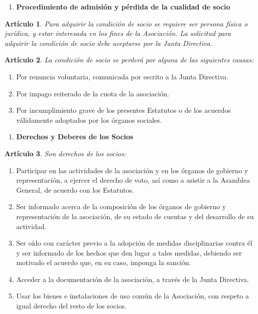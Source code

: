 \documentclass[a4paper,12pt]{article}
\theoremstyle{mystyle}		%
\newtheorem{art}{Artículo}	%
\begin{document}
\begin{onehalfspace}
\bigskip

\begin{enumerate}[resume*=capitulo]\centering
 \item \textbf{Procedimiento de admisión y pérdida de la cualidad de socio}
\end{enumerate}

\begin{art}
Para adquirir la condición de socio se requiere ser persona física o jurídica, y estar interesada en los fines de la Asociación. La solicitud para adquirir la condición de socio debe aceptarse por la Junta Directiva.
\end{art}

\begin{art}
La condición de socio se perderá por alguna de las siguientes causas:
\end{art}
\begin{enumerate}[label={\alph*)}]
 \item Por renuncia voluntaria, comunicada por escrito a la Junta Directiva.
 \item Por impago reiterado de la cuota de la asociación.
 \item Por incumplimiento grave de los presentes Estatutos o de los acuerdos válidamente adoptados por los órganos sociales.
\end{enumerate}

\bigskip

\begin{enumerate}[resume*=capitulo]\centering
 \item \textbf{Derechos y Deberes de los Socios}
\end{enumerate}

\begin{art}
Son derechos de los socios:
\end{art}
\begin{enumerate}[label={\alph*)}]
 \item Participar en las actividades de la asociación y en los órganos de gobierno y representación, a ejercer el derecho de voto, así como a asistir a la Asamblea General, de acuerdo con los Estatutos.
 \item Ser informado acerca de la composición de los órganos de gobierno y representación de la asociación, de su estado de cuentas y del desarrollo de su actividad.
 \item Ser oído con carácter previo a la adopción de medidas disciplinarias contra él y ser informado de los hechos que den lugar a tales medidas, debiendo ser motivado el acuerdo que, en su caso, imponga la sanción.
 \item Acceder a la documentación de la asociación, a través de la Junta Directiva.
 \item Usar los bienes e instalaciones de uso común de la Asociación, con respeto a igual derecho del resto de los socios.
\end{enumerate}


\end{onehalfspace}
\end{document}
